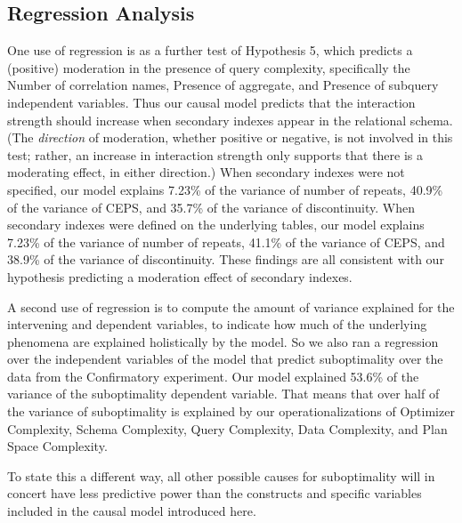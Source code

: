 \documentclass[prodmode,acmtods]{acmsmall}
\begin{document}
\subsection{Regression Analysis}\label{sec:regression}
One use of regression is as a further test of Hypothesis 5, which predicts a (positive)
moderation in the presence of query complexity, specifically the Number of
correlation names, Presence of aggregate, and Presence of subquery
independent variables. Thus our causal model predicts that the interaction
strength should increase when secondary indexes appear in the relational
schema. (The {\em direction} of moderation, whether positive or negative, is not involved in this test; rather,
an increase in interaction strength only supports that there is a moderating
effect, in either direction.) When
secondary indexes were not specified, our model explains 
7.23\% of the variance of number of repeats, 40.9\% of the variance of CEPS, and 35.7\% of the variance
of discontinuity. When
secondary indexes were defined on the underlying tables, our model explains
7.23\% of the variance of number of repeats, 41.1\% of the variance of CEPS, and
38.9\% of the variance of discontinuity. These findings are all consistent with our
hypothesis predicting a moderation effect of secondary indexes.

A second use of regression is to compute the amount of variance explained
for the intervening and dependent variables, to indicate how much of the
underlying phenomena are explained holistically by the model.
 So we also ran a regression over the independent variables of the model that
predict suboptimality over the data from the Confirmatory experiment. Our
model explained 53.6\% of the variance of the suboptimality dependent
variable. That means that over half of the variance of suboptimality is
explained by our operationalizations of Optimizer Complexity, Schema
Complexity, Query Complexity, Data Complexity, and Plan Space Complexity.

To state this a different way, all other possible causes for suboptimality
will in concert have less predictive power than the constructs and specific
variables included in the causal model introduced here.
\end{document}
